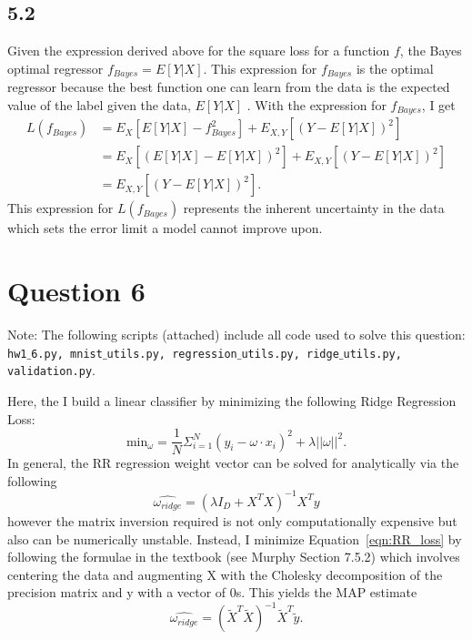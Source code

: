 \documentclass[12pt]{amsart}
\begin{document}
\subsection*{5.2}
Given the expression derived above for the square loss for a function $f$, the Bayes optimal regressor $f_{Bayes} = E[Y|X]$.  This expression for $f_{Bayes}$ is the optimal regressor because the best function one can learn from the data is the expected value of the label given the data, $E[Y|X]$ .  With the expression for $f_{Bayes}$, I get 
\begin{equation}
\begin{split}
L(f_{Bayes}) & = E_X[E[Y|X] - f_{Bayes}^2] + E_{X,Y}[(Y - E[Y|X])^2] \\
& = E_X[(E[Y|X] - E[Y|X])^2] + E_{X,Y}[(Y - E[Y|X])^2] \\
& = E_{X,Y}[(Y - E[Y|X])^2].
\end{split}
\end{equation}
This expression for $L(f_{Bayes})$ represents the inherent uncertainty in the data which sets the error limit a model cannot improve upon.


\section*{Question 6}

Note: The following scripts (attached) include all code used to solve this question: {\tt hw1$\_$6.py, mnist$\_$utils.py, regression$\_$utils.py, ridge$\_$utils.py, validation.py}.

Here, the I build a linear classifier by minimizing the following Ridge Regression Loss:
\begin{equation} \label{eqn:RR_loss}
\text{min}_{\omega} = \frac{1}{N} \Sigma_{i = 1}^N (y_i - \omega \cdot x_i)^2 + \lambda || \omega ||^2.
\end{equation}
In general, the RR regression weight vector can be solved for analytically via the following
\begin{equation} \label{eqn:RR_w}
\hat{\omega_{ridge}} = (\lambda I_D + X^T X)^{-1} X^T y
\end{equation}
however the matrix inversion required is not only computationally expensive but also can be numerically unstable.  Instead, I minimize Equation~\ref{eqn:RR_loss} by following the formulae in the textbook (see Murphy Section 7.5.2) which involves centering the data and augmenting X with the Cholesky decomposition of the precision matrix and y with a vector of 0s.  This yields the MAP estimate
\begin{equation} \label{eqn:RR_w_murphy}
\hat{\omega_{ridge}} = (\tilde{X}^T \tilde{X})^{-1} \tilde{X}^T \tilde{y}.
\end{equation}
\end{document}
